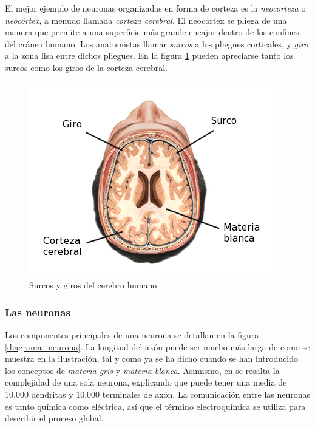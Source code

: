 
El mejor ejemplo de neuronas organizadas en forma de corteza es la {\it neocorteza} o {\it neocórtex}, a menudo llamada {\it corteza cerebral}. El neocórtex se pliega de una manera que permite a una superficie más grande encajar dentro de los confines del cráneo humano. Los anatomistas llamar {\it surcos} a los pliegues corticales, y {\it giro} a la zona lisa entre dichos pliegues. En la figura \ref{surcosygiros} pueden apreciarse tanto los surcos como los giros de la corteza cerebral.

\begin{figure}[h]
  \begin{center}
    \includegraphics[scale=0.8]{images/surcosygiros.jpg}
    \caption{Surcos y giros del cerebro humano}
    \label{surcosygiros}
  \end{center}
\end{figure}

\subsubsection{Las neuronas}

Los componentes principales de una neurona se detallan en la figura \ref{diagrama_neurona}. La longitud del axón puede ser mucho más larga de como se muestra en la ilustración, tal y como ya se ha dicho cuando se han introducido los conceptos de {\it materia gris} y {\it materia blanca}. Asimismo, en \cite{Sapolsky} se resalta la complejidad de una sola neurona, explicando que puede tener una media de 10.000 dendritas y 10.000 terminales de axón. La comunicación entre las neuronas es tanto química como eléctrica, así que el término electroquímica se utiliza para describir el proceso global.

